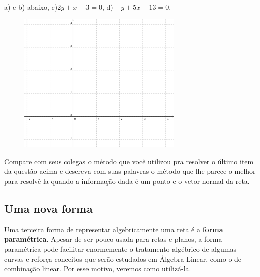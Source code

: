 \documentclass[main.tex]{subfiles}
\begin{document}
\begin{gabarito}
	\begin{gabaritoQuestao}
		a) e b) abaixo, c)$2y+x-3=0$, d) $-y+5x-13=0$.

    \begin{figure}[h]
        \centering
        \includegraphics[width=0.7\textwidth]{./img/c6q9.png}
    \end{figure}

	\end{gabaritoQuestao}
\end{gabarito}


\begin{reflita}
 Compare com seus colegas o método que você utilizou pra resolver o último item da questão acima e descreva com suas palavras o método que lhe parece o melhor para resolvê-la quando a informação dada é um ponto e o vetor normal da reta.
\end{reflita}

\subsection*{Uma nova forma}

Uma terceira forma de representar algebricamente uma reta é a \textbf{forma paramétrica}. Apesar de ser pouco usada para retas e planos, a forma paramétrica pode facilitar enormemente o tratamento algébrico de algumas curvas e reforça conceitos que serão estudados em Álgebra Linear, como o de combinação linear. Por esse motivo, veremos como utilizá-la.
\end{document}
